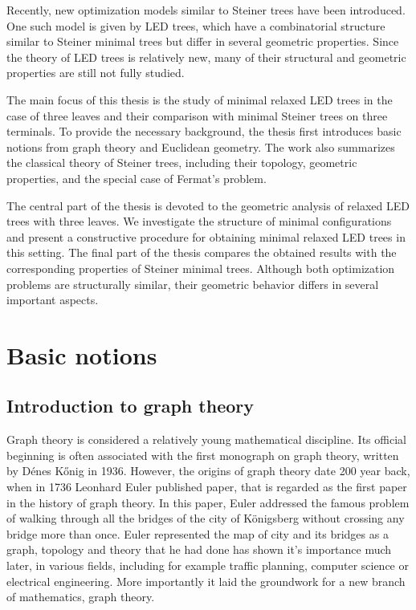 \documentclass[openany]{book}
\begin{document}
	Recently, new optimization models similar to Steiner trees have been introduced. One such model is given by LED trees, which have a combinatorial structure similar to Steiner minimal trees but differ in several geometric properties. Since the theory of LED trees is relatively new, many of their structural and geometric properties are still not fully studied.
	
	The main focus of this thesis is the study of minimal relaxed LED trees in the case of three leaves and their comparison with minimal Steiner trees on three terminals. To provide the necessary background, the thesis first introduces basic notions from graph theory and Euclidean geometry. The work also summarizes the classical theory of Steiner trees, including their topology, geometric properties, and the special case of Fermat's problem.
	
	The central part of the thesis is devoted to the geometric analysis of relaxed LED trees with three leaves. We investigate the structure of minimal configurations and present a constructive procedure for obtaining minimal relaxed LED trees in this setting. The final part of the thesis compares the obtained results with the corresponding properties of Steiner minimal trees. Although both optimization problems are structurally similar, their geometric behavior differs in several important aspects.
	\chapter{Basic notions}
	
	\section{Introduction to graph theory}
	Graph theory is considered a relatively young mathematical discipline. Its official beginning is often associated with the first monograph on graph theory, written by Dénes Kőnig in 1936. However, the origins of graph theory date 200 year back, when in 1736 Leonhard Euler published paper, that is regarded as the first paper in the history of graph theory. In this paper, Euler addressed the famous problem of walking through all the bridges of the city of Königsberg without crossing any bridge more than once. Euler represented the map of city and its bridges as a graph, topology and theory that he had done has shown it's importance much later, in various fields, including for example traffic planning, computer science or electrical engineering. More importantly it laid the groundwork for a new branch of mathematics, graph theory.
	
\end{document}
